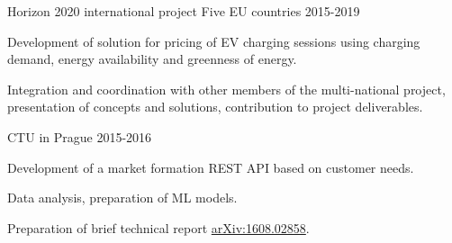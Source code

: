 \begin{cventries}
  \cventry
    {Horizon 2020 international project} %
    {} %
    {Five EU countries} %
    {2015-2019} %
    {
      \begin{cvitems} %
        \item {Development of solution for pricing of EV charging sessions using charging demand, energy availability and greenness of energy.}
        \item {Integration and coordination with other members of the multi-national project, presentation of concepts and solutions, contribution to project deliverables.}
      \end{cvitems}
    }

  \cventry
    {} %
    {} %
    {CTU in Prague} %
    {2015-2016} %
    {
      \begin{cvitems} %
        \item {Development of a market formation REST API based on customer needs.}
        \item {Data analysis, preparation of ML models.}
        \item {Preparation of brief technical report \href{https://arxiv.org/abs/1608.02858}{arXiv:1608.02858}.}
      \end{cvitems}
    }

\end{cventries}
    




